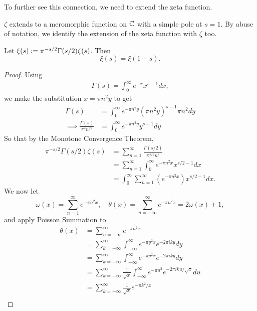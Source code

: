 To further see this connection, we need to extend the zeta function.
\begin{theorem} \label{analyticcontinuation}
	$\zeta$ extends to a meromorphic function on $\mathbb{C}$ with a simple pole at $s=1$. By abuse of notation, we identify the extension of the zeta function with $\zeta$ too.
\end{theorem}
\begin{theorem}
	Let $\xi(s)\mathrel{\mathop:}= \pi^{-s/2}\Gamma(s/2)\zeta(s)$. Then \begin{equation}\label{symmetryeq}
		\xi(s) = \xi(1-s).
	\end{equation}
\end{theorem}
\begin{proof}
	Using \begin{align*}
		\Gamma(s)=\int_{0}^{\infty} e^{-x}x^{s-1}dx,
	\end{align*}
	we make the substitution $x=\pi n^2y$ to get \begin{align*}
		\Gamma(s)&= \int_{0}^{\infty} e^{-\pi n^2 y} (\pi n^2 y)^{s-1} \pi n^2 dy\\
		\implies \frac{\Gamma(s)}{\pi^s n^{2s}} &= \int_{0}^{\infty} e^{-\pi n^2 y} y^{s-1} dy
	\end{align*}
	So that by the Monotone Convergence Theorem,\begin{align*}
		\pi^{-s/2}\Gamma(s/2)\zeta(s) &= \sum_{n=1}^{\infty}\frac{\Gamma(s/2)}{\pi^{s/2} n^s}\\
		&= \sum_{n=1}^{\infty} \int_{0}^{\infty} e^{-\pi n^2x} x^{s/2-1} dx\\
		&=  \int_{0}^{\infty}\sum_{n=1}^{\infty}\left(e^{-\pi n^2 x}\right)  x^{s/2-1} dx.
	\end{align*}
	We now let \[
		\omega(x) = \sum_{n=1}^{\infty} e^{-\pi n^2 x}, \quad \theta(x) = \sum_{n=-\infty}^{\infty} e^{-\pi n^2 x} = 2\omega(x)+1,
	\]
	and apply Poisson Summation to \begin{align*}
		\theta(x) &= \sum_{n=-\infty}^{\infty} e^{-\pi n^2 x}\\
		&= \sum_{k=-\infty}^{\infty} \int_{-\infty}^{\infty} e^{-\pi y^2 x} e^{-2\pi i k y} dy\\
		&= \sum_{k=-\infty}^{\infty} \int_{-\infty}^{\infty} e^{-\pi y^2 x} e^{-2\pi i k y} dy\\
		&= \sum_{k=-\infty}^{\infty} \frac{1}{\sqrt{x}} \int_{-\infty}^{\infty} e^{-\pi u^2} e^{-2\pi i k u /\sqrt{x}} du\\
		&= \sum_{k=-\infty}^{\infty} \frac{1}{\sqrt{x}} e^{-\pi k^2  / x}\\

\end{align*}
\end{proof}
